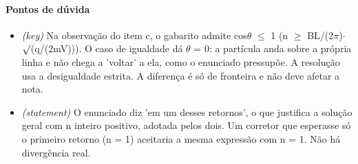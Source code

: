 \documentclass{article}%
\begin{document}
\paragraph{Pontos de dúvida}%
\begin{itemize}%
\item%
\textit{(key)} Na observação do item c, o gabarito admite cos$\theta$ $\leq$ 1 (n $\geq$ BL/(2$\pi$)$\cdot$$\surd$(q/(2mV))). O caso de igualdade dá $\theta$ = 0: a partícula anda sobre a própria linha e não chega a 'voltar' a ela, como o enunciado pressupõe. A resolução usa a desigualdade estrita. A diferença é só de fronteira e não deve afetar a nota.%
\item%
\textit{(statement)} O enunciado diz 'em um desses retornos', o que justifica a solução geral com n inteiro positivo, adotada pelos dois. Um corretor que esperasse só o primeiro retorno (n = 1) aceitaria a mesma expressão com n = 1. Não há divergência real.%
\end{itemize}%
\end{document}
